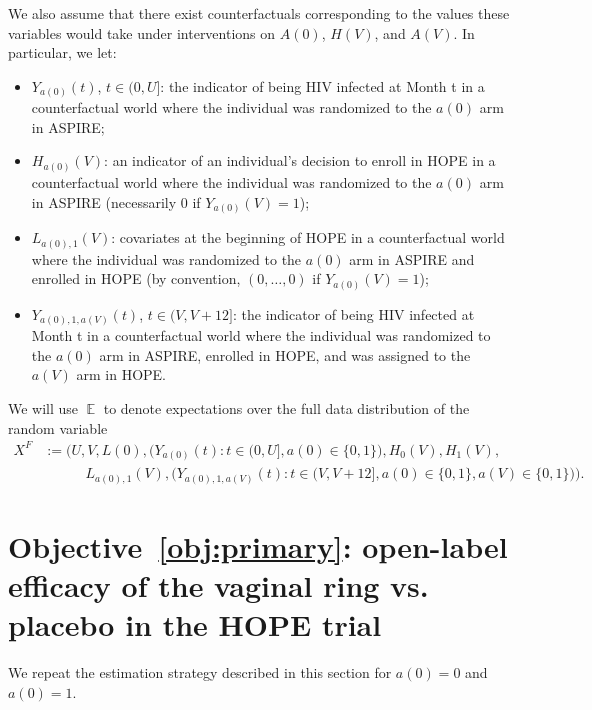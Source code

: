 \documentclass[12pt]{article}
\theoremstyle{definition}
\DeclareMathOperator{\cE}{\mathbb{E}}
\newcommand{\Aclose}{U}
\newcommand{\Hopen}{V}
\begin{document}
We also assume that there exist counterfactuals corresponding to the values these variables would take under interventions on $A(0)$, $H(\Hopen)$, and $A(\Hopen)$. In particular, we let:
\begin{itemize}
    \item $Y_{a(0)}(t)$, $t\in (0,\Aclose]$: the indicator of being HIV infected at Month t in a counterfactual world where the individual was randomized to the $a(0)$ arm in ASPIRE;
    \item $H_{a(0)}(\Hopen)$: an indicator of an individual's decision to enroll in HOPE in a counterfactual world where the individual was randomized to the $a(0)$ arm in ASPIRE (necessarily $0$ if $Y_{a(0)}(\Hopen)=1$);
    \item $L_{a(0),1}(\Hopen)$: covariates at the beginning of HOPE in a counterfactual world where the individual was randomized to the $a(0)$ arm in ASPIRE and enrolled in HOPE (by convention, $(0,\ldots,0)$ if $Y_{a(0)}(\Hopen)=1$);
    \item $Y_{a(0),1,a(\Hopen)}(t)$, $t\in(\Hopen,\Hopen+12]$: the indicator of being HIV infected at Month t in a counterfactual world where the individual was randomized to the $a(0)$ arm in ASPIRE, enrolled in HOPE, and was assigned to the $a(\Hopen)$ arm in HOPE. %
\end{itemize}

We will use $\cE$ to denote expectations over the full data distribution of the random variable
\begin{align*}
    X^F&:= \Bigg(\Aclose, \Hopen, L(0),\Big(Y_{a(0)}(t) : t\in(0,\Aclose],a(0)\in\{0,1\}\Big),H_{0}(\Hopen),H_{1}(\Hopen),\\
    &\hspace{3em} L_{a(0),1}(\Hopen),\Big(Y_{a(0),1,a(\Hopen)}(t) : t\in(\Hopen,\Hopen+12],a(0)\in\{0,1\},a(\Hopen)\in\{0,1\}\Big)\Bigg).
\end{align*}

\section{Objective~\ref{obj:primary}: open-label efficacy of the vaginal ring vs. placebo in the HOPE trial}
We repeat the estimation strategy described in this section for $a(0)=0$ and $a(0)=1$.
\end{document}
